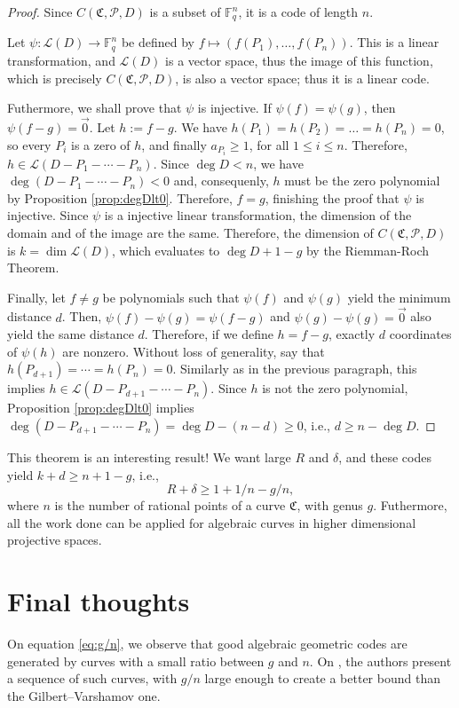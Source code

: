 \documentclass[11pt, oneside]{amsart}
\theoremstyle{definition}
\theoremstyle{remark}
\numberwithin{equation}{section}
\begin{document}
\begin{proof}
	Since $C(\mathfrak C, \mathcal P, D)$ is a subset of $\mathbb{F}_q^n$, it is a code of length $n$.

	Let $\psi: \mathcal L(D) \to \mathbb{F}_q^n$ be defined by $f \mapsto (f(P_1), \dots, f(P_n))$. This is a linear transformation, and $\mathcal L(D)$ is a vector space, thus the image of this function, which is precisely $C(\mathfrak C, \mathcal P, D)$, is also a vector space; thus it is a linear code.

	Futhermore, we shall prove that $\psi$ is injective.
	If $\psi(f) = \psi(g)$, then $\psi(f - g) = \vec 0$.
	Let $h := f-g$.
	We have $h(P_1) = h(P_2) = \dots = h(P_n) = 0$, so every $P_i$ is a zero of $h$, and finally $a_{P_i} \ge 1$, for all $1 \le i \le n$.
	Therefore, $h \in \mathcal L(D - P_1 - \cdots - P_n)$.
	Since $\deg D < n$, we have $\deg(D - P_1 - \cdots - P_n) < 0$ and, consequenly, $h$ must be the zero polynomial by Proposition \ref{prop:degDlt0}.
	Therefore, $f = g$, finishing the proof that $\psi$ is injective.
	Since $\psi$ is a injective linear transformation, the dimension of the domain and of the image are the same.
	Therefore, the dimension of $C(\mathfrak C, \mathcal P, D)$ is $k = \dim \mathcal L(D)$, which evaluates to $\deg D + 1 - g$ by the Riemman-Roch Theorem.

	Finally, let $f \neq g$ be polynomials such that $\psi(f)$ and $\psi(g)$ yield the minimum distance $d$.
	Then, $\psi(f) - \psi(g) = \psi(f-g)$ and $\psi(g) - \psi(g) = \vec 0$ also yield the same distance $d$.
	Therefore, if we define $h = f - g$, exactly  $d$ coordinates of $\psi(h)$ are nonzero.
	Without loss of generality, say that $h(P_{d+1}) = \cdots = h(P_n) = 0$.
	Similarly as in the previous paragraph, this implies $h \in \mathcal L(D - P_{d+1} - \cdots - P_n)$.
	Since $h$ is not the zero polynomial, Proposition \ref{prop:degDlt0} implies $\deg(D - P_{d+1} - \cdots - P_n) = \deg D - (n-d) \ge 0$, i.e., $d \ge n - \deg D$.
\end{proof}

This theorem is an interesting result! We want large $R$ and $\delta$, and these codes yield $k + d \ge n + 1 - g$, i.e., 
	\begin{equation}
		\label{eq:g/n} R + \delta \ge 1 + 1/n - g/n,
	\end{equation}
where $n$ is the number of rational points of a curve $\mathfrak C$, with genus $g$.
Futhermore, all the work done can be applied for algebraic curves in higher dimensional projective spaces.

\section{Final thoughts}\label{s:tvz}

On equation \eqref{eq:g/n}, we observe that good algebraic geometric codes are generated by curves with a small ratio between $g$ and $n$.
On \cite{TVZ82}, the authors present a sequence of such curves, with $g/n$ large enough to create a better bound than the Gilbert--Varshamov one.

\printbibliography
\end{document}
